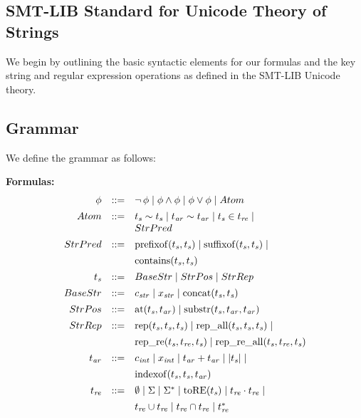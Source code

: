 \subsection{SMT-LIB Standard for Unicode Theory of Strings}

\label{app:grammar}

We begin by outlining the basic syntactic elements for our formulas and the key string and regular expression operations as defined in the SMT-LIB Unicode theory.

\subsection*{Grammar}

We define the grammar as follows:

\medskip

\noindent\textbf{Formulas:}
\[
\begin{array}{rcl}
	\phi & ::= & \lnot\, \phi \mid \phi \land \phi \mid \phi \lor \phi \mid Atom \\[1ex]
	Atom & ::= & t_{\mathit{s}} \sim t_{\mathit{s}} \mid t_{\mathit{ar}} \sim t_{\mathit{ar}} \mid t_{\mathit{s}} \in t_{\mathit{re}} \mid \\
	&     & StrPred \\[1ex]
	StrPred & ::= & \operatorname{prefixof}(t_{\mathit{s}}, t_{\mathit{s}}) \mid \operatorname{suffixof}(t_{\mathit{s}}, t_{\mathit{s}}) \mid \\[1ex]
	&     & \operatorname{contains}(t_{\mathit{s}}, t_{\mathit{s}}) \\[1ex]
	t_{\mathit{s}} & ::= & BaseStr \mid StrPos \mid StrRep \\[1ex]
	BaseStr & ::= & c_{\mathit{str}} \mid x_{\mathit{str}} \mid  \operatorname{concat}(t_{\mathit{s}},t_{\mathit{s}})\  \\[1ex]
	StrPos & ::= & \operatorname{at}(t_{\mathit{s}}, t_{\mathit{ar}}) \mid \operatorname{substr}(t_{\mathit{s}}, t_{\mathit{ar}}, t_{\mathit{ar}}) \\[1ex]
	StrRep & ::= & \operatorname{rep}(t_{\mathit{s}}, t_{\mathit{s}}, t_{\mathit{s}}) \mid \operatorname{rep\_all}(t_{\mathit{s}}, t_{\mathit{s}}, t_{\mathit{s}}) \mid \\[1ex]
	& & \operatorname{rep\_re}(t_{\mathit{s}}, t_{\mathit{re}}, t_{\mathit{s}}) \mid \operatorname{rep\_re\_all}(t_{\mathit{s}}, t_{\mathit{re}}, t_{\mathit{s}}) \\[1ex]
	t_{\mathit{ar}} & ::= & c_{\mathit{int}} \mid x_{\mathit{int}} \mid t_{\mathit{ar}} + t_{\mathit{ar}} \mid \lvert t_{\mathit{s}} \rvert \mid \\[1ex]
	&     & \operatorname{indexof}(t_{\mathit{s}}, t_{\mathit{s}}, t_{\mathit{ar}}) \\[1ex]
	t_{\mathit{re}} & ::= & \emptyset \mid \Sigma \mid \Sigma^* \mid \operatorname{toRE}(t_{\mathit{s}}) \mid t_{\mathit{re}} \cdot t_{\mathit{re}} \mid \\[1ex]
	&     & t_{\mathit{re}} \cup t_{\mathit{re}} \mid t_{\mathit{re}} \cap t_{\mathit{re}} \mid t_{\mathit{re}}^*
\end{array}
\]



